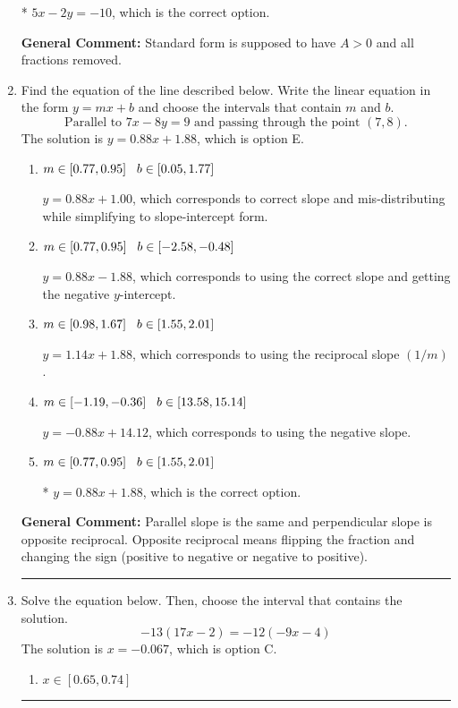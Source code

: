 \documentclass{extbook}[14pt]
\newcommand{\litem}[1]{\item #1

\rule{\textwidth}{0.4pt}}
\begin{document}
\begin{enumerate}
{\begin{enumerate}[label=\Alph*.]
* $5x - 2y = -10$, which is the correct option.
\end{enumerate}

\textbf{General Comment:} Standard form is supposed to have $A > 0$ and all fractions removed.
}
\litem{
Find the equation of the line described below. Write the linear equation in the form $ y=mx+b $ and choose the intervals that contain $m$ and $b$.
\[ \text{Parallel to } 7 x - 8 y = 9 \text{ and passing through the point } (7, 8). \]The solution is \( y = 0.88x + 1.88 \), which is option E.\begin{enumerate}[label=\Alph*.]
\item \( m \in [0.77, 0.95] \hspace*{3mm} b \in [0.05, 1.77] \)

 $y = 0.88x + 1.00$, which corresponds to correct slope and mis-distributing while simplifying to slope-intercept form.
\item \( m \in [0.77, 0.95] \hspace*{3mm} b \in [-2.58, -0.48] \)

 $y = 0.88x - 1.88$, which corresponds to using the correct slope and getting the negative $y$-intercept.
\item \( m \in [0.98, 1.67] \hspace*{3mm} b \in [1.55, 2.01] \)

 $y = 1.14x + 1.88$, which corresponds to using the reciprocal slope $(1/m)$.
\item \( m \in [-1.19, -0.36] \hspace*{3mm} b \in [13.58, 15.14] \)

 $y = -0.88x + 14.12$, which corresponds to using the negative slope.
\item \( m \in [0.77, 0.95] \hspace*{3mm} b \in [1.55, 2.01] \)

* $y = 0.88x + 1.88$, which is the correct option.
\end{enumerate}

\textbf{General Comment:} Parallel slope is the same and perpendicular slope is opposite reciprocal. Opposite reciprocal means flipping the fraction and changing the sign (positive to negative or negative to positive).
}
\litem{
Solve the equation below. Then, choose the interval that contains the solution.
\[ -13(17x -2) = -12(-9x -4) \]The solution is \( x = -0.067 \), which is option C.\begin{enumerate}[label=\Alph*.]
\item \( x \in [0.65, 0.74] \)


\end{enumerate}}
\end{enumerate}
\end{document}
